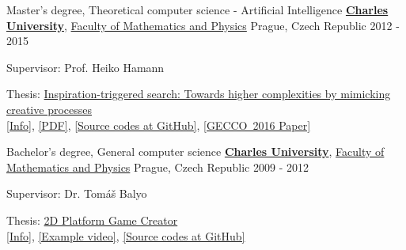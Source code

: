 \begin{cventries}
  \cventry
{Master's degree, Theoretical computer science - Artificial Intelligence} %
{\href{http://cuni.cz}{\textbf{Charles University}}, \href{http://www.mff.cuni.cz}
	{Faculty of Mathematics and Physics}} %
{Prague, Czech Republic} %
{2012 - 2015} %
{
	\begin{cvitems} %
		\item {Supervisor: Prof. Heiko Hamann}
		\item {Thesis: \href{http://milanrybar.cz/inspiration-triggered-search}{Inspiration-triggered search: Towards higher complexities by mimicking creative processes}  \\ \hspace*{2em} 
		\href{http://milanrybar.cz/inspiration-triggered-search}{[Info]}, 
		\href{http://milanrybar.cz/data/ITS/ITS_Thesis.pdf}{[PDF]}, 
		\href{https://github.com/milan-rybar/inspiration-triggered-search}{[Source codes at GitHub]}, 
		\href{http://milanrybar.cz/data/ITS/GECCO2016/ITS_GECCO2016_Paper.pdf}{[GECCO~2016 Paper]} %
		}
	\end{cvitems}
}

  \cventry
{Bachelor's degree, General computer science} %
{\href{http://cuni.cz}{\textbf{Charles University}}, \href{http://www.mff.cuni.cz}
	{Faculty of Mathematics and Physics}} %
{Prague, Czech Republic} %
{2009 - 2012} %
{
	\begin{cvitems} %
		\item {Supervisor: Dr. Tomáš Balyo}
		\item {Thesis: \href{http://milanrybar.cz/2pgc}{2D Platform Game Creator} \\ \hspace*{2em} 
		\href{http://milanrybar.cz/2pgc}{[Info]}, 
		\href{https://www.youtube.com/watch?v=WxjpEEXgAvo}{[Example video]}, 
		\href{https://github.com/milan-rybar/2D-Platform-Game-Creator}{[Source codes at GitHub]} %
		}
	\end{cvitems}
}

\end{cventries}
